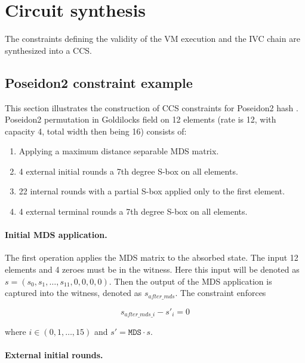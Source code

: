 \section{Circuit synthesis}

The constraints defining the validity of the VM execution and the IVC chain
are synthesized into a CCS.

\subsection{Poseidon2 constraint example}

This section illustrates the construction of CCS constraints for Poseidon2
hash \cite{Poseidon2}. Poseidon2 permutation in Goldilocks field on 12 elements (rate is 12,
with capacity 4, total width then being 16) consists of:

\begin{enumerate}
	\item Applying a maximum distance separable MDS matrix.
	\item 4 external initial rounds a 7th degree S-box on all elements.
	\item 22 internal rounds with a partial S-box applied only to the first element.
	\item 4 external terminal rounds a 7th degree S-box on all elements.
\end{enumerate}

\paragraph{Initial MDS application.}

The first operation applies the MDS matrix to the absorbed state. The input 12 elements
and 4 zeroes must be in the witness. Here this input will be denoted as $s = (s_0, s_1, \ldots, s_{11}, 0, 0, 0, 0)$.
Then the output of the MDS application is captured into the witness, denoted as $s_{after\_mds}$.
The constraint enforces

\begin{equation}
	s_{after\_mds\_i} - s'_i = 0
\end{equation}

where $i \in (0, 1, \ldots, 15)$ and $s' = \texttt{MDS} \cdot s$.

\paragraph{External initial rounds.}

